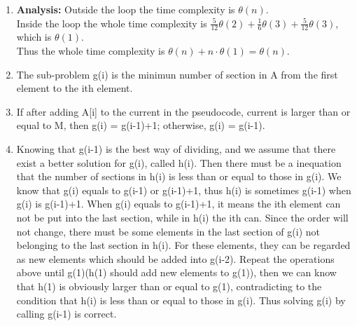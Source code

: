 \begin{solution}
    \begin{enumerate}
        \item \textbf{Analysis:}
              Outside the loop the time complexity is $\theta(n)$. \\
              Inside the loop the whole time complexity is $\frac{5}{12} \theta(2) + \frac{1}{6} \theta(3) + \frac{5}{12} \theta(3)$,
              which is $\theta(1)$. \\
              Thus the whole time complexity is $\theta(n) + n \cdot \theta(1) = \theta(n)$.
        \item The sub-problem g(i) is the minimun number of section in A from the first element to the ith element.
        \item If after adding A[i] to the current in the pseudocode, current is larger than or equal to M, then g(i) = g(i-1)+1; otherwise, g(i) = g(i-1).
        \item Knowing that g(i-1) is the best way of dividing, and we assume that there exist a better solution for g(i), called h(i).
              Then there must be a inequation that the number of sections in h(i) is less than or equal to those in g(i).
              We know that g(i) equals to g(i-1) or g(i-1)+1, thus h(i) is sometimes g(i-1) when g(i) is g(i-1)+1.
              When g(i) equals to g(i-1)+1, it means the ith element can not be put into the last section, while in h(i) the ith can.
              Since the order will not change, there must be some elements in the last section of g(i) not belonging to the last section in h(i).
              For these elements, they can be regarded as new elements which should be added into g(i-2).
              Repeat the operations above until g(1)(h(1) should add new elements to g(1)), then we can know that h(1) is obviously larger than or equal to g(1), contradicting to the condition that h(i) is less than or equal to those in g(i).
              Thus solving g(i) by calling g(i-1) is correct.
    \end{enumerate}
\end{solution}